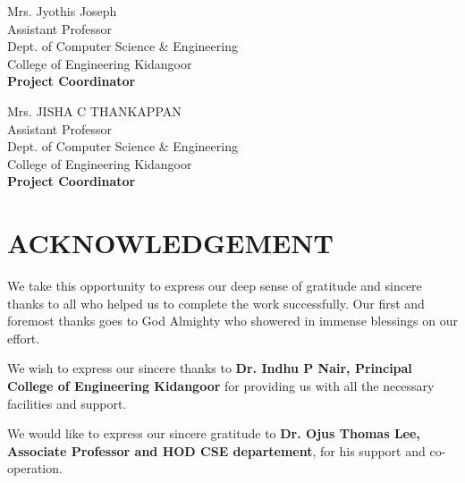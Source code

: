 \documentclass[twoside,a4paper,openright]{report} %
\begin{document}
\noindent
\begin{minipage}{0.45\linewidth}
	\begin{flushleft}                         
		Mrs. Jyothis Joseph \\
		\footnotesize{Assistant Professor\\
			Dept. of Computer Science \& Engineering\\
			College of Engineering Kidangoor}\\
		\textbf{Project Coordinator} \\
	\end{flushleft}
\end{minipage}%
\hfill
\begin{minipage}{0.45\linewidth}
	\begin{flushright}                                       
		Mrs. JISHA C THANKAPPAN \\
		\footnotesize{Assistant Professor\\
			Dept. of Computer Science \& Engineering\\
			College of Engineering Kidangoor}\\
		\textbf{Project Coordinator} \\
	\end{flushright}
\end{minipage}




	
	
	
	
	
	
	
\thispagestyle{empty}


\newpage
	\vspace*{3cm}
\section*{\centering \large ACKNOWLEDGEMENT}%

We take this opportunity to express our deep sense of gratitude and sincere thanks to all who helped us to complete the work successfully. Our first and foremost thanks goes to God Almighty who showered in immense blessings on our effort.

We wish to express our sincere thanks to \textbf{Dr. Indhu P Nair, Principal College of Engineering Kidangoor} for providing  us with all the necessary facilities and support.

We would like to express our sincere gratitude to \textbf{Dr. Ojus Thomas Lee, Associate Professor and HOD CSE departement}, for his support and co-operation.
\end{document}
